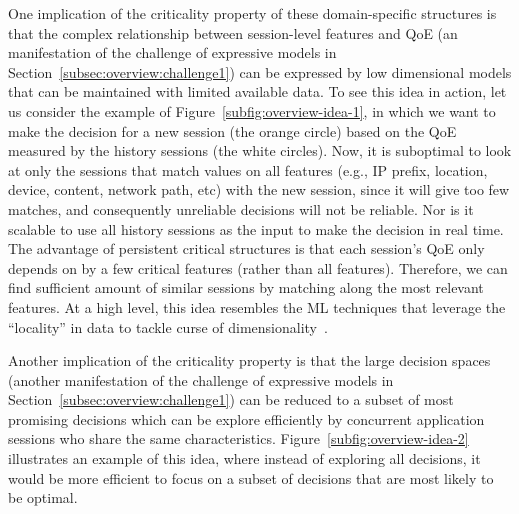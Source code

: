 One implication of the criticality property of these domain-specific structures is that 
the complex relationship between session-level features and QoE (an manifestation of 
the challenge of expressive models in Section~\ref{subsec:overview:challenge1}) can be 
expressed by low dimensional models that can be maintained with limited available data.
To see this idea in action, let us consider the example of 
Figure~\ref{subfig:overview-idea-1},  in which we want to make the decision for a new 
session (the orange circle) based on the QoE measured by the history sessions (the 
white circles). Now, it is suboptimal to look at only the sessions that match values on all 
features (e.g., IP prefix, location, device, content, network path, etc) with the new session, 
since it will give too few matches, and consequently unreliable decisions will not be reliable.
Nor is it scalable to use all history sessions as the input to make the decision in real time.
The advantage of persistent critical structures is that each session's QoE only depends 
on by a few critical features (rather than all features). Therefore, we can find sufficient 
amount of similar sessions by matching along the most relevant features. At a high level, 
this idea resembles the ML techniques that leverage the ``locality'' in data to tackle 
curse of dimensionality~\cite{ml101}.

Another implication of the criticality property is that the large decision spaces (another 
manifestation of the challenge of expressive models in 
Section~\ref{subsec:overview:challenge1}) can be reduced to a subset of most promising 
decisions which can be explore efficiently by concurrent application sessions who share
the same characteristics. Figure~\ref{subfig:overview-idea-2} illustrates an example of this 
idea, where instead of exploring all decisions, it would be more efficient to focus on a subset 
of decisions that are most likely to be optimal.


